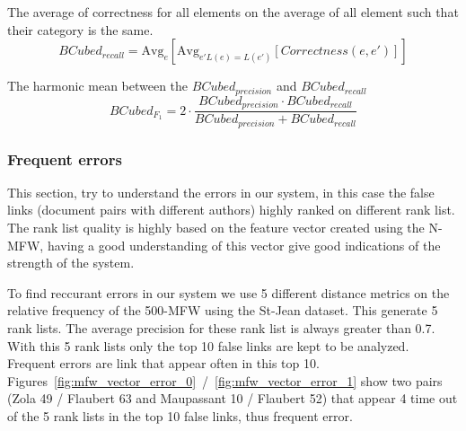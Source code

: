 \begin{definition}
  The average of correctness for all elements on the average of all element such that their category is the same.
  \begin{equation}
    BCubed_{recall} = \text{Avg}_{e}[\text{Avg}_{e' L(e)=L(e')}[Correctness(e, e')]]
  \end{equation}
\end{definition}

\begin{definition}
  The harmonic mean between the $BCubed_{precision}$ and $BCubed_{recall}$
  \begin{equation}
    BCubed_{F_1} =
    2 \cdot \frac{BCubed_{precision} \cdot BCubed_{recall}}
    {BCubed_{precision} + BCubed_{recall}}
  \end{equation}
\end{definition}


\subsubsection{Frequent errors}

This section, try to understand the errors in our system, in this case the false links (document pairs with different authors) highly ranked on different rank list.
The rank list quality is highly based on the feature vector created using the N-MFW, having a good understanding of this vector give good indications of the strength of the system.

To find reccurant errors in our system we use 5 different distance metrics on the relative frequency of the 500-MFW using the St-Jean dataset.
This generate 5 rank lists.
The average precision for these rank list is always greater than 0.7.
With this 5 rank lists only the top 10 false links are kept to be analyzed.
Frequent errors are link that appear often in this top 10.
Figures~\ref{fig:mfw_vector_error_0}~/~\ref{fig:mfw_vector_error_1} show two pairs (Zola 49 / Flaubert 63 and Maupassant 10 / Flaubert 52) that appear 4 time out of the 5 rank lists in the top 10 false links, thus frequent error.

